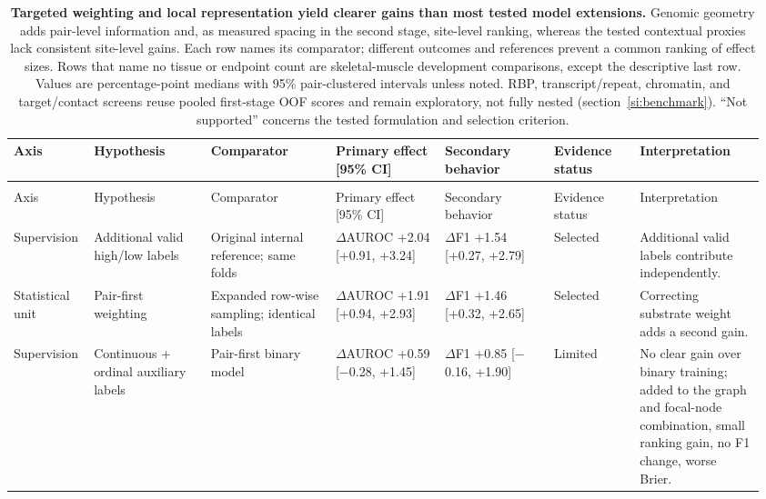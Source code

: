 \begin{landscape}
\begingroup
\fontsize{7.0}{7.8}\selectfont\sffamily
\setlength{\tabcolsep}{1.8pt}
\renewcommand{\arraystretch}{1.10}
\begin{longtable}{>{\raggedright\arraybackslash}p{0.10\linewidth}>{\raggedright\arraybackslash}p{0.15\linewidth}>{\raggedright\arraybackslash}p{0.16\linewidth}>{\raggedright\arraybackslash}p{0.14\linewidth}>{\raggedright\arraybackslash}p{0.14\linewidth}>{\raggedright\arraybackslash}p{0.11\linewidth}>{\raggedright\arraybackslash}p{0.16\linewidth}}
\caption{\textbf{Targeted weighting and local representation yield clearer gains than most tested model extensions.} Genomic geometry adds pair-level information and, as measured spacing in the second stage, site-level ranking, whereas the tested contextual proxies lack consistent site-level gains. Each row names its comparator; different outcomes and references prevent a common ranking of effect sizes. Rows that name no tissue or endpoint count are skeletal-muscle development comparisons, except the descriptive last row. Values are percentage-point medians with 95\% pair-clustered intervals unless noted. RBP, transcript/repeat, chromatin, and target/contact screens reuse pooled first-stage OOF scores and remain exploratory, not fully nested (section~\ref{si:benchmark}). ``Not supported'' concerns the tested formulation and selection criterion.}\label{tab:evidencemap}\\
\toprule
Axis & Hypothesis & Comparator & Primary effect [95\% CI] & Secondary behavior & Evidence status & Interpretation \\
\midrule
\endfirsthead
\multicolumn{7}{l}{\textit{Table continued}}\\
\toprule
Axis & Hypothesis & Comparator & Primary effect [95\% CI] & Secondary behavior & Evidence status & Interpretation \\
\midrule
\endhead
Supervision & Additional valid high/low labels & Original internal reference; same folds & $\Delta$AUROC +2.04 [+0.91, +3.24] & $\Delta$F1 +1.54 [+0.27, +2.79] & Selected & Additional valid labels contribute independently. \\
Statistical unit & Pair-first weighting & Expanded row-wise sampling; identical labels & $\Delta$AUROC +1.91 [+0.94, +2.93] & $\Delta$F1 +1.46 [+0.32, +2.65] & Selected & Correcting substrate weight adds a second gain. \\
Supervision & Continuous + ordinal auxiliary labels & Pair-first binary model & $\Delta$AUROC +0.59 [$-$0.28, +1.45] & $\Delta$F1 +0.85 [$-$0.16, +1.90] & Limited & No clear gain over binary training; added to the graph and focal-node combination, small ranking gain, no F1 change, worse Brier. \\

\end{longtable}
\end{landscape}
